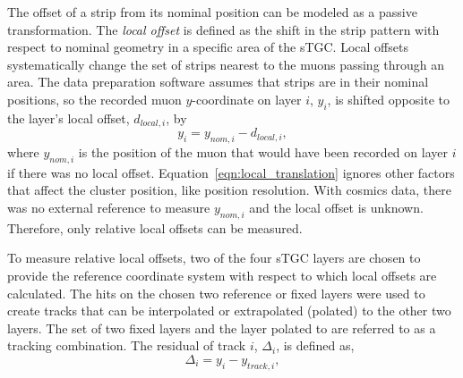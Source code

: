 The offset of a strip from its nominal position can be modeled as a passive transformation. The \textit{local offset} is defined as the shift in the strip pattern with respect to nominal geometry in a specific area of the sTGC. Local offsets systematically change the set of strips nearest to the muons passing through an area. The data preparation software assumes that strips are in their nominal positions, so the recorded muon $y$-coordinate on layer $i$, $y_i$, is shifted opposite to the layer's local offset, $d_{local, i}$, by
\begin{equation}
    y_i = y_{nom, i} - d_{local, i},
    \label{eqn:local_translation}
\end{equation}
where $y_{nom, i}$ is the position of the muon that would have been recorded on layer $i$ if there was no local offset. Equation~\ref{eqn:local_translation} ignores other factors that affect the cluster position, like position resolution. With cosmics data, there was no external reference to measure $y_{nom, i}$ and the local offset is unknown. Therefore, only relative local offsets can be measured. 


To measure relative local offsets, two of the four sTGC layers are chosen to provide the reference coordinate system with respect to which local offsets are calculated. The hits on the chosen two reference or fixed layers were used to create tracks that can be interpolated or extrapolated (polated) to the other two layers. The set of two fixed layers and the layer polated to are referred to as a tracking combination. The residual of track $i$, $\Delta_i$, is defined as,
\begin{equation}
    \Delta_i = y_{i} - y_{track, i},
    \label{eqn:residual}
\end{equation}

